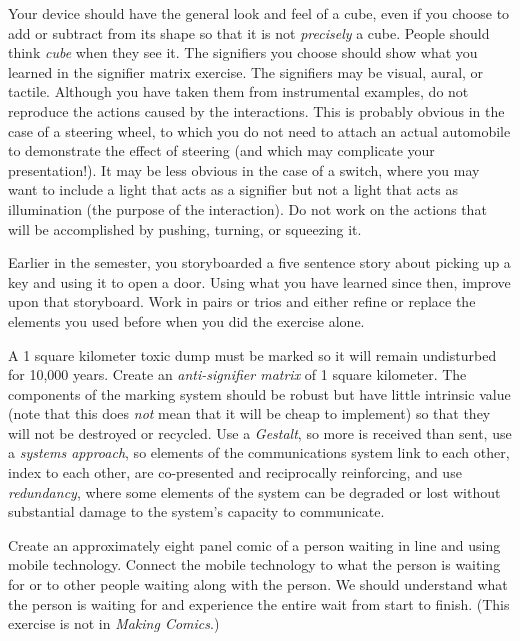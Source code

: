 Your device should have the general look and feel of a cube, even if you
choose to add or subtract from its shape so that it is not
\emph{precisely} a cube. People should think \emph{cube} when they see
it. The signifiers you choose should show what you learned in the
signifier matrix exercise. The signifiers may be visual, aural, or
tactile. Although you have taken them from instrumental examples, do not
reproduce the actions caused by the interactions. This is probably
obvious in the case of a steering wheel, to which you do not need to
attach an actual automobile to demonstrate the effect of steering (and
which may complicate your presentation!). It may be less obvious in the
case of a switch, where you may want to include a light that acts as a
signifier but not a light that acts as illumination (the purpose of the
interaction). Do not work on the actions that will be accomplished by
pushing, turning, or squeezing it.

\hypertarget{revisit-picking-up-a-key}{%
\label{revisit-picking-up-a-key}}

Earlier in the semester, you storyboarded a five sentence story about
picking up a key and using it to open a door. Using what you have
learned since then, improve upon that storyboard. Work in pairs or trios
and either refine or replace the elements you used before when you did
the exercise alone.

\hypertarget{anti-signifier-matrix}{%
\label{anti-signifier-matrix}}

A 1 square kilometer toxic dump must be marked so it will remain
undisturbed for 10,000 years. Create an \emph{anti-signifier matrix} of
1 square kilometer. The components of the marking system should be
robust but have little intrinsic value (note that this does \emph{not}
mean that it will be cheap to implement) so that they will not be
destroyed or recycled. Use a \emph{Gestalt}, so more is received than
sent, use a \emph{systems approach}, so elements of the communications
system link to each other, index to each other, are co-presented and
reciprocally reinforcing, and use \emph{redundancy}, where some elements
of the system can be degraded or lost without substantial damage to the
system's capacity to communicate.

\hypertarget{waiting-in-line}{%
\label{waiting-in-line}}

Create an approximately eight panel comic of a person waiting in line
and using mobile technology. Connect the mobile technology to what the
person is waiting for or to other people waiting along with the person.
We should understand what the person is waiting for and experience the
entire wait from start to finish. (This exercise is not in \emph{Making
Comics}.)


